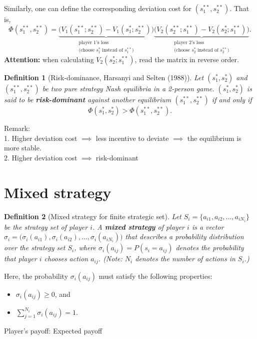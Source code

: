 \documentclass[twoside]{article}
\theoremstyle{definitionstyle}
\newtheorem*{definition}{Definition}
\begin{document}
Similarly, one can define the corresponding deviation cost for $(s_1^{**}, s_2^{**})$. That is,
\[
\Phi(s_1^{**}, s_2^{**}) = 
\underbrace{\bigl(V_1(s_1^{**}; s_2^{**}) - V_1(s_1^*; s_2^{**})\bigr)}_{
\substack{\text{player 1's loss} \\ \text{(choose } s_1^* \text{ instead of } s_1^{**}\text{)}}
}
\underbrace{\bigl(V_2(s_2^{**}; s_1^{**}) - V_2(s_2^*; s_1^{**})\bigr)}_{
\substack{\text{player 2's loss} \\ \text{(choose } s_2^* \text{ instead of } s_2^{**}\text{)}}
}.
\]
\textbf{Attention:} when calculating $V_2(s_2^*; s_1^{**})$, read the matrix in reverse order.
\begin{definition}[Risk-dominance, Harsanyi and Selten (1988)]
   Let $(s_1^*, s_2^*)$ and $(s_1^{**}, s_2^{**})$ be two pure strategy Nash equilibria in a 2-person game. $(s_1^*, s_2^*)$ is said to be \textbf{risk-dominant} against another equilibrium $(s_1^{**}, s_2^{**})$ if and only if
\[
\Phi(s_1^*, s_2^*) > \Phi(s_1^{**}, s_2^{**}).
\]
\end{definition}
Remark:\\
1. Higher deviation cost $\implies$ less incentive to deviate $\implies$ the equilibrium is more stable.\\
2. Higher deviation cost $\implies$ risk-dominant
%
%
%
%
%
\section{Mixed strategy}
\begin{definition}[Mixed strategy for finite strategic set]
Let $S_i = \{a_{i1}, a_{i2}, \dots, a_{iN_i}\}$ be the strategy set of player $i$.
A \textbf{mixed strategy} of player $i$ is a vector $\sigma_i = \bigl(\sigma_i(a_{i1}), \sigma_i(a_{i2}), \dots, \sigma_i(a_{iN_i})\bigr)$ that describes a probability distribution over the strategy set $S_i$,
where $\sigma_i(a_{ij}) = P(s_i = a_{ij})$
denotes the probability that player $i$ chooses action $a_{ij}$.
(Note: $N_i$ denotes the number of actions in $S_i$.)
\end{definition}
Here, the probability $\sigma_i(a_{ij})$ must satisfy the following properties:
\begin{itemize}
    \item $\sigma_i(a_{ij}) \geq 0$, and
    \item $\displaystyle\sum_{j=1}^{N_i} \sigma_i(a_{ij}) = 1$.
\end{itemize}
Player's payoff: Expected payoff
\end{document}
